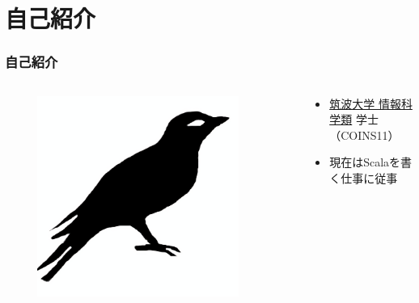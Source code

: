 





\newcommand\ballref[1]{%
\tikz \node[circle, shade,ball color=structure.fg,inner sep=0pt,%
  text width=8pt,font=\tiny,align=center] {\color{white}\ref{#1}};
}




\frame{\maketitle}

\section{自己紹介}
\begin{frame}[fragile]
  \frametitle{自己紹介}
  
  \begin{columns}
    \begin{column}{0.4\textwidth}
      \centering
      \begin{figure}
        \includegraphics[width=0.9\textwidth]{img/bird2x.png}
      \end{figure}
    \end{column}
    \begin{column}{0.6\textwidth}
      \begin{itemize}
        \item<2-> \href{https://www.coins.tsukuba.ac.jp/}{筑波大学 情報科学類} 学士（COINS11）
        \item<3-> 現在はScalaを書く仕事に従事
      \end{itemize}
    \end{column}
  \end{columns}
\end{frame}

